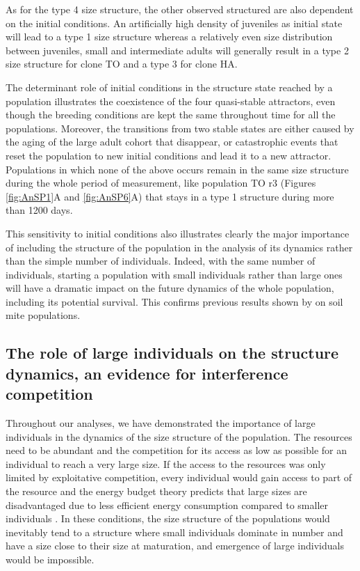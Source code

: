 As for the type 4 size structure, the other observed structured are also
dependent on the initial conditions. An artificially high density of juveniles
as initial state will lead to a type 1 size structure whereas a relatively even
size distribution between juveniles, small and intermediate adults will
generally result in a type 2 size structure for clone TO and a type 3 for clone
HA.

The determinant role of initial conditions in the structure state reached by a
population illustrates the coexistence of the four quasi-stable attractors, even
though the breeding conditions are kept the same throughout time for all the
populations. Moreover, the transitions from two stable states are either caused
by the aging of the large adult cohort that disappear, or catastrophic events
that reset the population to new initial conditions and lead it to a new
attractor. Populations in which none of the above occurs remain in the same size
structure during the whole period of measurement, like population TO r3 (Figures
\ref{fig:AnSP1}A and \ref{fig:AnSP6}A) that stays in a type 1 structure during more than 1200
days.

This sensitivity to initial conditions also illustrates clearly the major
importance of including the structure of the population in the analysis of its
dynamics rather than the simple number of individuals. Indeed, with the same
number of individuals, starting a population with small individuals rather than
large ones will have a dramatic impact on the future dynamics of the whole
population, including its potential survival. This confirms previous results
shown by \textcites{benton2005a} on soil mite populations.

\subsection{The role of large individuals on the structure dynamics, an evidence
for interference competition}

Throughout our analyses, we have demonstrated the importance of large
individuals in the dynamics of the size structure of the population. The
resources need to be abundant and the competition for its access as low as
possible for an individual to reach a very large size. If the access to the
resources was only limited by exploitative competition, every individual would
gain access to part of the resource and the energy budget theory predicts that
large sizes are disadvantaged due to less efficient energy consumption compared
to smaller individuals \autocites{de-roos2003b}. In these conditions, the
size structure of the populations would inevitably tend to a structure where small individuals
dominate in number and have a size close to their size at maturation, and
emergence of large individuals would be impossible.

